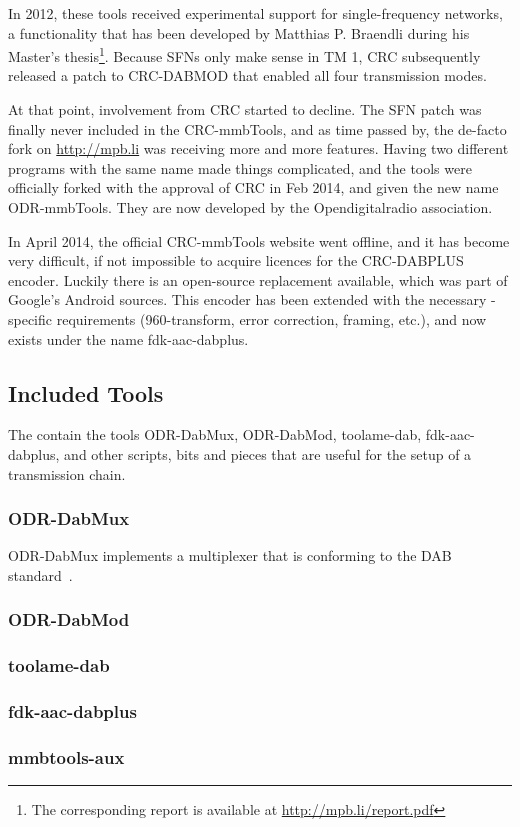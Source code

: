 In 2012, these tools received experimental support for single-frequency
networks, a functionality that has been developed by Matthias P. Braendli during
his Master's thesis\footnote{The corresponding report is available at
    \url{http://mpb.li/report.pdf}}.
Because SFNs only make sense in TM 1, CRC subsequently released a patch to
\mbox{CRC-DABMOD} that enabled all four transmission modes.

At that point, involvement from CRC started to decline. The SFN patch was
finally never included in the \mbox{CRC-mmbTools}, and as time passed by, the
de-facto fork on \url{http://mpb.li} was receiving more and more features.
Having two different programs with the same name made things complicated, and
the tools were officially forked with the approval of CRC in Feb 2014, and given
the new name \mbox{ODR-mmbTools}. They are now developed by the Opendigitalradio
association.

In April 2014, the official \mbox{CRC-mmbTools} website went offline, and it has
become very difficult, if not impossible to acquire licences for the
\mbox{CRC-DABPLUS} encoder. Luckily there is an open-source replacement
available, which was part of Google's Android sources. This encoder has been
extended with the necessary \dabplus{}-specific requirements (960-transform,
error correction, framing, etc.), and now exists under the name
\mbox{fdk-aac-dabplus}.

\subsection{Included Tools}
The \mmbtools contain the tools \mbox{ODR-DabMux}, \mbox{ODR-DabMod},
\mbox{toolame-dab}, \mbox{fdk-aac-dabplus}, and other scripts, bits and pieces
that are useful for the setup of a transmission chain.

\subsubsection{ODR-DabMux}
ODR-DabMux implements a multiplexer that is conforming to the DAB
standard~\cite{etsidab}.

\subsubsection{ODR-DabMod}
\subsubsection{toolame-dab}
\subsubsection{fdk-aac-dabplus}
\subsubsection{mmbtools-aux}



